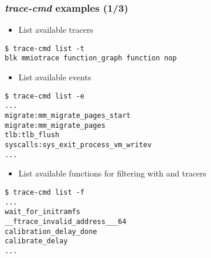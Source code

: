 \begin{frame}[fragile]
  \frametitle{{\em trace-cmd} examples (1/3)}
  \begin{itemize}
    \item List available tracers
  \end{itemize}
  \begin{block}{}
    \begin{verbatim}
$ trace-cmd list -t
blk mmiotrace function_graph function nop
    \end{verbatim}
  \end{block}
  \begin{itemize}
    \item List available events
  \end{itemize}
  \begin{block}{}
    \begin{verbatim}
$ trace-cmd list -e
...
migrate:mm_migrate_pages_start
migrate:mm_migrate_pages
tlb:tlb_flush
syscalls:sys_exit_process_vm_writev
...
    \end{verbatim}
  \end{block}
  
  \begin{itemize}
    \item List available functions for filtering with  and
         tracers
  \end{itemize}
  \begin{block}{}
    \begin{verbatim}
$ trace-cmd list -f
...
wait_for_initramfs
__ftrace_invalid_address___64
calibration_delay_done
calibrate_delay
...
    \end{verbatim}
  \end{block}


\end{frame}

